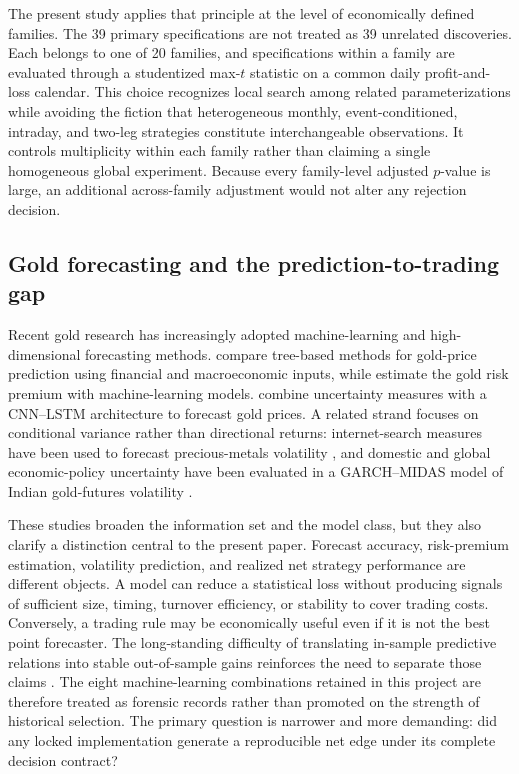 The present study applies that principle at the level of economically defined families. The 39 primary specifications are not treated as 39 unrelated discoveries. Each belongs to one of 20 families, and specifications within a family are evaluated through a studentized max-$t$ statistic on a common daily profit-and-loss calendar. This choice recognizes local search among related parameterizations while avoiding the fiction that heterogeneous monthly, event-conditioned, intraday, and two-leg strategies constitute interchangeable observations. It controls multiplicity within each family rather than claiming a single homogeneous global experiment. Because every family-level adjusted $p$-value is large, an additional across-family adjustment would not alter any rejection decision.

\subsection{Gold forecasting and the prediction-to-trading gap}

Recent gold research has increasingly adopted machine-learning and high-dimensional forecasting methods. \citet{cohen2023} compare tree-based methods for gold-price prediction using financial and macroeconomic inputs, while \citet{diaz2023} estimate the gold risk premium with machine-learning models. \citet{you2025} combine uncertainty measures with a CNN--LSTM architecture to forecast gold prices. A related strand focuses on conditional variance rather than directional returns: internet-search measures have been used to forecast precious-metals volatility \citep{li2024}, and domestic and global economic-policy uncertainty have been evaluated in a GARCH--MIDAS model of Indian gold-futures volatility \citep{simran2025}.

These studies broaden the information set and the model class, but they also clarify a distinction central to the present paper. Forecast accuracy, risk-premium estimation, volatility prediction, and realized net strategy performance are different objects. A model can reduce a statistical loss without producing signals of sufficient size, timing, turnover efficiency, or stability to cover trading costs. Conversely, a trading rule may be economically useful even if it is not the best point forecaster. The long-standing difficulty of translating in-sample predictive relations into stable out-of-sample gains reinforces the need to separate those claims \citep{welch2008}. The eight machine-learning combinations retained in this project are therefore treated as forensic records rather than promoted on the strength of historical selection. The primary question is narrower and more demanding: did any locked implementation generate a reproducible net edge under its complete decision contract?

